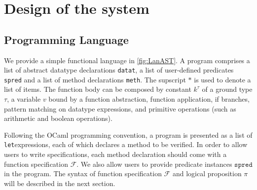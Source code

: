 
\chapter{Design of the system}
\label{ch:design}
\vspace{2em}


\section{Programming Language}

We provide a simple functional language in \autoref{fig:LanAST}. A program
comprises a list of abstract datatype declarations \texttt{datat}, a list of user-defined predicates \texttt{spred} and a list of method declarations
\texttt{meth}. The supscript $*$ is used to denote a list of items. The function
body can be composed by constant $k^{\tau}$ of a ground type $\tau$, a variable $v$ bound by a function abstraction, 
function application, if branches, pattern matching on datatype
expressions, and primitive operations (such as arithmetic and boolean operations).

Following the OCaml programming convention, a program is presented as a 
list of \texttt{let}\zz{}expressions, each of which declares a method to be
verified. In order to allow users to write specifications, each method
declaration should come with a function specification $\mathcal{F}$. 
We also allow users to provide predicate instances $\texttt{spred}$ in
the program. The syntax of function specification $\mathcal{F}$ and 
logical proposition $\pi$ will be described in the next section.

